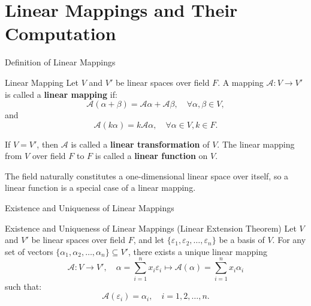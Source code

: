 \documentclass[11pt]{../../TexTemplate/elegantbook} %
\begin{document}
\section{Linear Mappings and Their Computation}
\begin{leftbarTitle}{Definition of Linear Mappings}\end{leftbarTitle}
\begin{definition}{Linear Mapping}
    Let \( V \) and \( V' \) be linear spaces over field \( F \).
    A mapping \( \mathcal{A}: V \to V' \) is called a \textbf{linear mapping} if:
    \[
    \mathcal{A}(\alpha + \beta) = \mathcal{A}\alpha + \mathcal{A}\beta, \quad \forall \alpha, \beta \in V,
    \]
    and
    \[
    \mathcal{A}(k\alpha) = k\mathcal{A}\alpha, \quad \forall \alpha \in V, k \in F.
    \]

    If \( V = V' \), then \( \mathcal{A} \) is called a \textbf{linear transformation} of \( V \).
    The linear mapping from \( V \) over field \( F \) to \(F\) is called a \textbf{linear function} on \( V \).
\end{definition}

\begin{remark}
    The field naturally constitutes a one-dimensional linear space over itself, 
    so a linear function is a special case of a linear mapping.
\end{remark}




\begin{leftbarTitle}{Existence and Uniqueness of Linear Mappings}\end{leftbarTitle}
\begin{theorem}{Existence and Uniqueness of Linear Mappings (Linear Extension Theorem)}
    Let \( V \) and \( V' \) be linear spaces over field \( F \),
    and let \( \{\varepsilon_1, \varepsilon_2, \dots, \varepsilon_n\} \) be a basis of \( V \).
    For any set of vectors \( \{\alpha_1, \alpha_2, \dots, \alpha_n\} \subseteq V' \),
    there exists a unique linear mapping
    \[
    \mathcal{A}: V \to V', \quad 
    \alpha = \sum_{i=1}^{n} x_i \varepsilon_i \mapsto \mathcal{A}(\alpha) = \sum_{i=1}^{n} x_i \alpha_i
    \] 
    such that:
    \[
    \mathcal{A}(\varepsilon_i) = \alpha_i, \quad i = 1, 2, \dots, n.
    \]
    
\end{theorem}
\end{document}
